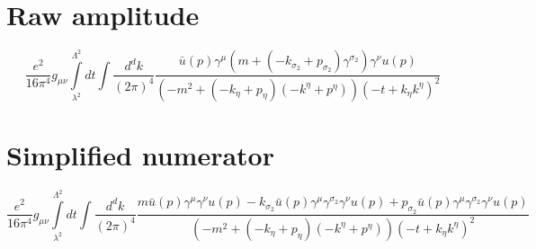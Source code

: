\section*{Raw amplitude}
\begin{dmath}\frac{e^{2}}{16 \pi^{4}}g_{ \mu \nu }\int\limits_{ \lambda^{2} }^{ \Lambda^{2} } dt\int\frac{d^d k }{ (2\pi)^4 }\frac{{ \bar{u}(p) } { \gamma^{ \mu } } \left(m + \left(- { { k }_{ \sigma_2 } } + { { p }_{ \sigma_2 } }\right) { \gamma^{ \sigma_2 } }\right) { \gamma^{ \nu } } u({ p })}{\left(- m^{2} + \left(- { { k }_{ \eta } } + { { p }_{ \eta } }\right) \left(- { { k }^{ \eta } } + { { p }^{ \eta } }\right)\right) \left(- t + { { k }_{ \eta } } { { k }^{ \eta } }\right)^{2}}\end{dmath}
\section*{Simplified numerator}
\begin{dmath}\frac{e^{2}}{16 \pi^{4}}g_{ \mu \nu }\int\limits_{ \lambda^{2} }^{ \Lambda^{2} } dt\int\frac{d^d k }{ (2\pi)^4 }\frac{m { \bar{u}(p) } { \gamma^{ \mu } } { \gamma^{ \nu } } u({ p }) - { { k }_{ \sigma_2 } } { \bar{u}(p) } { \gamma^{ \mu } } { \gamma^{ \sigma_2 } } { \gamma^{ \nu } } u({ p }) + { { p }_{ \sigma_2 } } { \bar{u}(p) } { \gamma^{ \mu } } { \gamma^{ \sigma_2 } } { \gamma^{ \nu } } u({ p })}{\left(- m^{2} + \left(- { { k }_{ \eta } } + { { p }_{ \eta } }\right) \left(- { { k }^{ \eta } } + { { p }^{ \eta } }\right)\right) \left(- t + { { k }_{ \eta } } { { k }^{ \eta } }\right)^{2}}\end{dmath}

